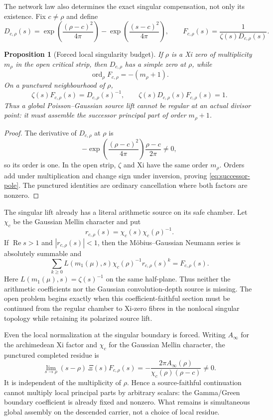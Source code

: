 \documentclass[11pt]{article}
\newtheorem{proposition}[theorem]{Proposition}
\theoremstyle{definition}
\theoremstyle{remark}
\newcommand{\Rea}{\operatorname{Re}}
\begin{document}
The network law also determines the exact singular compensation, not only its
existence.  Fix \(c\ne\rho\) and define
\[
 D_{c,\rho}(s)=
   \exp\!\left(\frac{(\rho-c)^2}{4\pi}\right)
   -\exp\!\left(\frac{(s-c)^2}{4\pi}\right),
 \qquad
 F_{c,\rho}(s)=\frac1{\zeta(s)D_{c,\rho}(s)}.
\tag{7.6c}\label{eq:singular-gaussian-lift}
\]

\begin{proposition}[Forced local singularity budget]
\label{prop:singular-budget}
If \(\rho\) is a Xi zero of multiplicity \(m_\rho\) in the open critical
strip, then \(D_{c,\rho}\) has a simple zero at \(\rho\), while
\[
             \operatorname{ord}_\rho F_{c,\rho}=-(m_\rho+1).
\tag{7.6d}\label{eq:successor-pole}
\]
On a punctured neighbourhood of \(\rho\),
\[
 \zeta(s)F_{c,\rho}(s)=D_{c,\rho}(s)^{-1},
 \qquad
 \zeta(s)D_{c,\rho}(s)F_{c,\rho}(s)=1.
\tag{7.6e}\label{eq:singular-lift-anomaly}
\]
Thus a global Poisson--Gaussian source lift cannot be regular at an actual
divisor point: it must assemble the successor principal part of order
\(m_\rho+1\).
\end{proposition}

\begin{proof}
The derivative of \(D_{c,\rho}\) at \(\rho\) is
\[
 -\exp\!\left(\frac{(\rho-c)^2}{4\pi}\right)
       \frac{\rho-c}{2\pi}\ne0,
\]
so its order is one.  In the open strip, \(\zeta\) and Xi have the same
order \(m_\rho\).  Orders add under multiplication and change sign under
inversion, proving \eqref{eq:successor-pole}.  The punctured identities are
ordinary cancellation where both factors are nonzero.
\end{proof}

The singular lift already has a literal arithmetic source on its safe
chamber.  Let \(\chi_c\) be the Gaussian Mellin character and put
\[
 r_{c,\rho}(s)=\chi_c(s)\chi_c(\rho)^{-1}.
\]
If \(\Rea s>1\) and \(|r_{c,\rho}(s)|<1\), then the M\"obius--Gaussian
Neumann series is absolutely summable and
\[
 \sum_{k\ge0}
   L\!\left(m_1(\mu),s\right)\chi_c(\rho)^{-1}
       r_{c,\rho}(s)^k
   =F_{c,\rho}(s).
\tag{7.6f}\label{eq:mobius-gaussian-neumann}
\]
Here \(L(m_1(\mu),s)=\zeta(s)^{-1}\) on the same half-plane.  Thus neither
the arithmetic coefficients nor the Gaussian convolution-depth source is
missing.  The open problem begins exactly when this coefficient-faithful
section must be continued from the regular chamber to Xi-zero fibres in the
nonlocal singular topology while retaining its polarized source lift.

Even the local normalization at the singular boundary is forced.  Writing
\(A_\infty\) for the archimedean Xi factor and \(\chi_c\) for the Gaussian
Mellin character, the punctured completed residue is
\[
 \lim_{s\to\rho}(s-\rho)\,\Xi(s)F_{c,\rho}(s)
   =-\frac{2\pi A_\infty(\rho)}
           {\chi_c(\rho)(\rho-c)}\ne0.
\tag{7.6g}\label{eq:gamma-green-residue}
\]
It is independent of the multiplicity of \(\rho\).  Hence a source-faithful
continuation cannot multiply local principal parts by arbitrary scalars:
the Gamma/Green boundary coefficient is already fixed and nonzero.  What
remains is simultaneous global assembly on the descended carrier, not a
choice of local residue.
\end{document}
